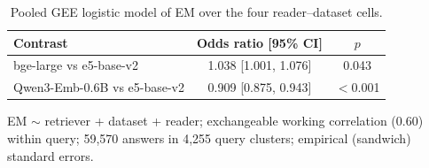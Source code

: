 \begin{table}[t]
\centering
\small
\caption{Pooled GEE logistic model of EM over the four reader--dataset cells.}
\label{tab:gee}
\begin{tabular}{lcc}
\toprule
Contrast & Odds ratio [95\% CI] & $p$ \\
\midrule
bge-large vs e5-base-v2 & 1.038 [1.001, 1.076] & 0.043 \\
Qwen3-Emb-0.6B vs e5-base-v2 & 0.909 [0.875, 0.943] & $<$0.001 \\
\bottomrule
\end{tabular}
\par\smallskip\parbox{\linewidth}{\footnotesize EM $\sim$ retriever + dataset + reader; exchangeable working correlation (0.60) within query; 59,570 answers in 4,255 query clusters; empirical (sandwich) standard errors.}
\end{table}
